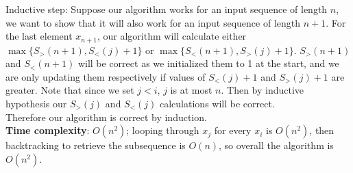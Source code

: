 \documentclass{article}
\begin{document}
\begin{itemize}
          Inductive step: Suppose our algorithm works for an input sequence of length $n$, we want to show that it will also work for an input sequence of length $n+1$. For the last element $x_{n+1}$, our algorithm will calculate either $\max\{S_>(n+1),S_<(j)+1\}$ or $\max\{S_<(n+1),S_>(j)+1\}$. $S_>(n+1)$ and $S_<(n+1)$ will be correct as we initialized them to 1 at the start, and we are only updating them respectively if values of $S_<(j)+1$ and $S_>(j)+1$ are greater. Note that since we set $j<i$, $j$ is at most $n$. Then by inductive hypothesis our $S_>(j)$ and $S_<(j)$ calculations will be correct.\\
          Therefore our algorithm is correct by induction.\\
          \textbf{Time complexity}: $O(n^2)$; looping through $x_j$ for every $x_i$ is $O(n^2)$, then backtracking to retrieve the subsequence is $O(n)$, so overall the algorithm is $O(n^2)$.
\end{itemize}
\end{document}
